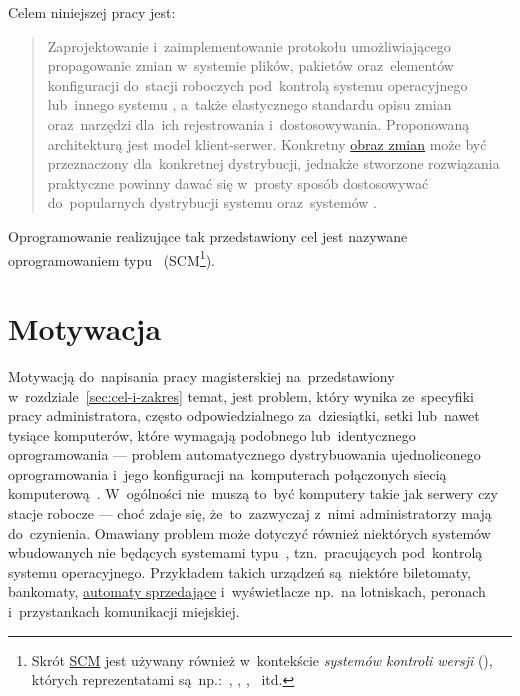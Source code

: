 \documentclass[thesis]{subfiles}
\begin{document}
\noindent Celem niniejszej pracy jest:\mynobreakpar
\blockcquote{formularz-zgloszenia-pracy}{Zaprojektowanie i~zaimplementowanie protokołu umożliwiającego propagowanie zmian w~systemie plików, pakietów oraz~elementów konfiguracji do~stacji roboczych pod~kontrolą systemu operacyjnego  lub~innego systemu , a~także elastycznego standardu opisu zmian oraz~narzędzi dla~ich rejestrowania i~dostosowywania. Proponowaną architekturą jest model klient-serwer. Konkretny \hyperref[sec:obraz-zmian-konfiguracji]{obraz zmian} może być przeznaczony dla~konkretnej dystrybucji, jednakże stworzone rozwiązania praktyczne powinny dawać się w~prosty sposób dostosowywać do~popularnych dystrybucji systemu  oraz~systemów .}\mynobreakpar
Oprogramowanie realizujące tak przedstawiony cel jest nazywane oprogramowaniem typu ~(SCM\footnote{Skrót \href{https://en.wikipedia.org/wiki/SCM}{SCM} jest używany również w~kontekście \emph{systemów kontroli wersji} (), których reprezentatami są~np.:~, , , ~itd.}).


\section{Motywacja}

Motywacją do~napisania pracy magisterskiej na~przedstawiony w~rozdziale~\ref{sec:cel-i-zakres} temat, jest problem, który wynika ze~specyfiki pracy administratora, często odpowiedzialnego za~dziesiątki, setki lub~nawet tysiące komputerów, które wymagają podobnego lub~identycznego oprogramowania --- problem automatycznego dystrybuowania ujednoliconego oprogramowania i~jego konfiguracji na~komputerach połączonych siecią komputerową~\cite{so-problem-intro}. W~ogólności nie~muszą to~być komputery takie jak serwery czy stacje robocze --- choć zdaje się, że~to~zazwyczaj z~nimi administratorzy mają do~czynienia. Omawiany problem może dotyczyć również niektórych systemów wbudowanych nie będących systemami typu~\mbox{}, tzn.~pracujących pod~kontrolą systemu operacyjnego. Przykładem takich urządzeń są~niektóre biletomaty, bankomaty, \href{https://en.wikipedia.org/wiki/Vending_machine}{automaty sprzedające} i~wyświetlacze np.~na lotniskach, peronach i~przystankach komunikacji miejskiej.
\end{document}

